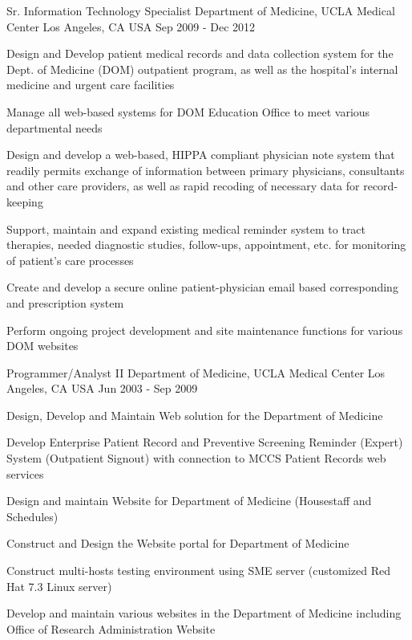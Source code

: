 \begin{cventries}
  \cventry
    {Sr. Information Technology Specialist} %
    {Department of Medicine, UCLA Medical Center} %
    {Los Angeles, CA USA} %
    {Sep 2009 - Dec 2012} %
    {
      \begin{cvitems} %
        \item {Design and Develop patient medical records and data collection system for the Dept. of Medicine (DOM) outpatient program, as well as the hospital's internal medicine and urgent care facilities}
        \item {Manage all web-based systems for DOM Education Office to meet various departmental needs}      
		 \item {Design and develop a web-based, HIPPA compliant physician note system that readily permits exchange of information between primary physicians, consultants and other care providers, as well as rapid recoding of necessary data for record-keeping} 
		 \item{Support, maintain and expand existing medical reminder system to tract therapies, needed diagnostic studies, follow-ups, appointment, etc. for monitoring of patient's care processes}  
		 \item{Create and develop a secure online patient-physician email based corresponding and prescription system}
		 \item{Perform ongoing project development and site maintenance functions for various DOM websites}
      \end{cvitems}
    }

 \cventry
    {Programmer/Analyst II} %
    {Department of Medicine, UCLA Medical Center} %
    {Los Angeles, CA USA} %
    {Jun 2003 - Sep 2009} %
    {
      \begin{cvitems} %
        \item {Design, Develop and Maintain Web solution for the Department of Medicine}
		 \item {Develop Enterprise Patient Record and Preventive Screening Reminder (Expert) System (Outpatient Signout) with connection to MCCS Patient Records web services}
		  \item {Design and maintain Website for Department of Medicine (Housestaff and Schedules)}
		  \item {Construct and Design the Website portal for Department of Medicine}
		   \item {Construct multi-hosts testing environment using SME server (customized Red Hat 7.3 Linux server)}
		   \item {Develop and maintain various websites in the Department of Medicine including Office of Research Administration Website}
      \end{cvitems}
    }


\end{cventries}
